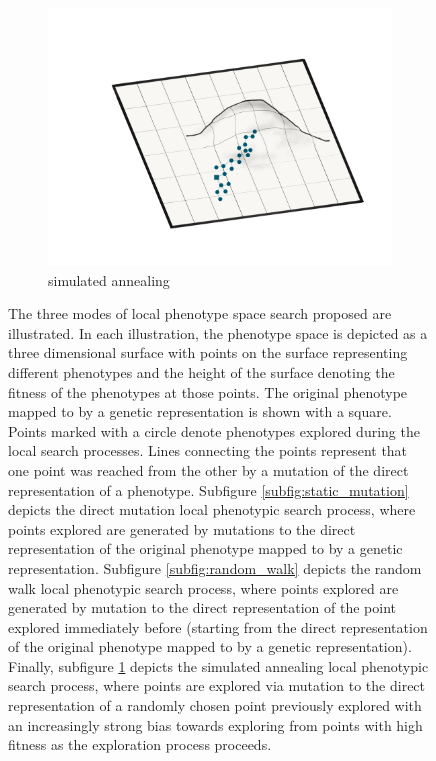 \begin{figure}
\begin{subfigure}[b]{0.5\textwidth}
        \centering
        \includegraphics[width=\textwidth]{img/simulated_annealing.png}
        \caption{simulated annealing}
        \label{subfig:simulated_annealing}
    \end{subfigure}
 	\captionsetup{singlelinecheck=off,justification=raggedright}
    \vspace{-2ex}
  \captionsetup{singlelinecheck=off,justification=raggedright}
  \caption{The three modes of local phenotype space search proposed are illustrated. In each illustration, the phenotype space is depicted as a three dimensional surface with points on the surface representing different phenotypes and the height of the surface denoting the fitness of the phenotypes at those points. The original phenotype mapped to by a genetic representation is shown with a square. Points marked with a circle denote phenotypes explored during the local search processes. Lines connecting the points represent that one point was reached from the other by a mutation of the direct representation of a phenotype. Subfigure \ref{subfig:static_mutation} depicts the direct mutation local phenotypic search process, where points explored are generated by mutations to the direct representation of the original phenotype mapped to by a genetic representation. Subfigure \ref{subfig:random_walk} depicts the random walk local phenotypic search process, where points explored are generated by mutation to the direct representation of the point explored immediately before (starting from the direct representation of the original phenotype mapped to by a genetic representation). Finally, subfigure \ref{subfig:simulated_annealing} depicts the simulated annealing local phenotypic search process, where points are explored via mutation to the direct representation of a randomly chosen point previously explored with an increasingly strong bias towards exploring from points with high fitness as the exploration process proceeds.}
  \label{fig:local_search_types}
\end{figure}

